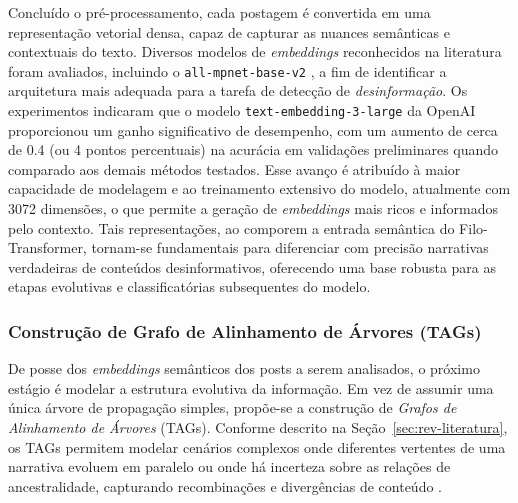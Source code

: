 \documentclass[12pt]{article}
\begin{document}
Concluído o pré-processamento, cada postagem é convertida em uma representação vetorial densa, capaz de capturar as nuances semânticas e contextuais do texto. Diversos modelos de \textit{embeddings} reconhecidos na literatura foram avaliados, incluindo o \texttt{\small all-mpnet-base-v2} \cite{reimers2019sbert}, a fim de identificar a arquitetura mais adequada para a tarefa de detecção de \textit{desinformação}. Os experimentos indicaram que o modelo \texttt{\small text-embedding-3-large} da OpenAI proporcionou um ganho significativo de desempenho, com um aumento de cerca de 0.4 (ou 4 pontos percentuais) na acurácia em validações preliminares quando comparado aos demais métodos testados. Esse avanço é atribuído à maior capacidade de modelagem e ao treinamento extensivo do modelo, atualmente com 3072 dimensões, o que permite a geração de \textit{embeddings} mais ricos e informados pelo contexto. Tais representações, ao comporem a entrada semântica do Filo-Transformer, tornam-se fundamentais para diferenciar com precisão narrativas verdadeiras de conteúdos desinformativos, oferecendo uma base robusta para as etapas evolutivas e classificatórias subsequentes do modelo.

\subsubsection{Construção de Grafo de Alinhamento de Árvores (TAGs)} \label{subsec:construcao-tags}
De posse dos \textit{embeddings} semânticos dos posts a serem analisados, o próximo estágio é modelar a estrutura evolutiva da informação. Em vez de assumir uma única árvore de propagação simples, propõe-se a construção de \textit{Grafos de Alinhamento de Árvores} (TAGs). Conforme descrito na Seção~\ref{sec:rev-literatura}, os TAGs permitem modelar cenários complexos onde diferentes vertentes de uma narrativa evoluem em paralelo ou onde há incerteza sobre as relações de ancestralidade, capturando recombinações e divergências de conteúdo \cite{smith2013tag}.
\end{document}
